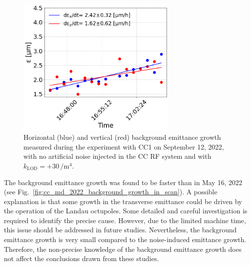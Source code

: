 
\begin{figure}[!h]
   \centering         
   \includegraphics[width=0.7\textwidth]{images/Ch8/cc_md_12sep22_backg_coast3.png}
       \caption{Horizontal (blue) and vertical (red) background emittance growth measured during the experiment with CC1 on September 12, 2022, with no artificial noise injected in the CC RF system and with $k_\mathrm{LOD}=+30$\,$\mathrm{/m^4}$.}
       \label{fig:H_V_emit_growth_background_subtracted_octupole_scan_sep22}
\end{figure}

The background emittance growth was found to be faster than in May 16, 2022 (see Fig.~\ref{fig:cc_md_2022_background_growth_in_scan}). A possible explanation is that some growth in the transverse emittance could be driven by the operation of the Landau octupoles. Some detailed and careful investigation is required to identify the precise cause. However, due to the limited machine time, this issue should be addressed in future studies. Nevertheless, the background emittance growth is very small compared to the noise-induced emittance growth. Therefore, the non-precise knowledge of the background emittance growth does not affect the conclusions drawn from these studies. 


